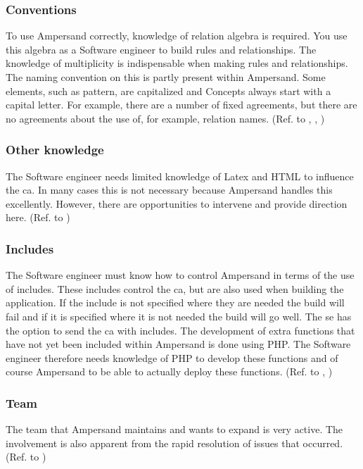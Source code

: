 \subsubsection{Conventions}\label{subsub:1_conventions}
To use Ampersand correctly, knowledge of relation algebra is required.
You use this algebra as a Software engineer to build rules and relationships.
The knowledge of multiplicity is indispensable when making rules and relationships.
The naming convention on this is partly present within Ampersand.
Some elements, such as pattern, are capitalized and Concepts always start with a capital letter.
For example, there are a number of fixed agreements, but there are no agreements about the use of, for example, relation names.
(Ref. to , , )

\subsubsection{Other knowledge}\label{subsub:1_other_knowledge}
The Software engineer needs limited knowledge of Latex and HTML to influence the \acrshort{ca}.
In many cases this is not necessary because Ampersand handles this excellently.
However, there are opportunities to intervene and provide direction here.
(Ref. to )

\subsubsection{Includes}\label{subsub:1_includes}
The Software engineer must know how to control Ampersand in terms of the use of includes.
These includes control the \acrshort{ca}, but are also used when building the application.
If the include is not specified where they are needed the build will fail and if it is specified where it is not needed the build will go well.
The \acrshort{se} has the option to send the \acrshort{ca} with includes.
The development of extra functions that have not yet been included within Ampersand is done using PHP.
The Software engineer therefore needs knowledge of PHP to develop these functions and of course Ampersand to be able to actually deploy these functions.
(Ref. to , )

\subsubsection{Team}\label{subsub:1_team}
The team that Ampersand maintains and wants to expand is very active.
The involvement is also apparent from the rapid resolution of issues that occurred.
(Ref. to )